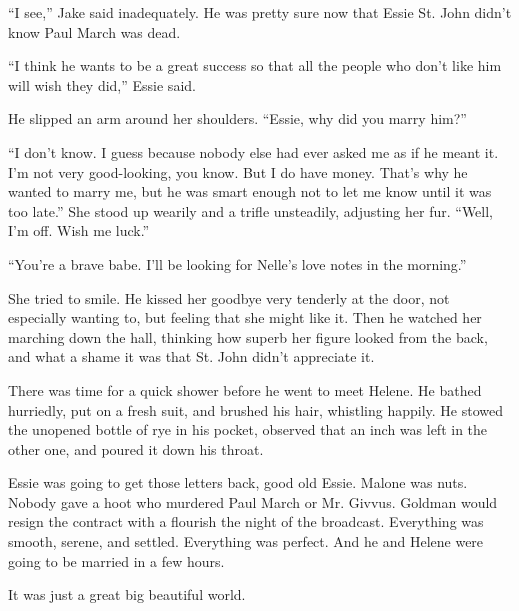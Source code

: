 \documentclass{novel}
\begin{document}
“I see,” Jake said inadequately. He was pretty sure now that Essie St. John didn’t know Paul March was dead.

“I think he wants to be a great success so that all the people who don’t like him will wish they did,” Essie said.

He slipped an arm around her shoulders. “Essie, why did you marry him?”

“I don’t know. I guess because nobody else had ever asked me as if he meant it. I’m not very good-looking, you know. But I do have money. That’s why he wanted to marry me, but he was smart enough not to let me know until it was too late.” She stood up wearily and a trifle unsteadily, adjusting her fur. “Well, I’m off. Wish me luck.”

“You’re a brave babe. I'll be looking for Nelle’s love notes in the morning.”

She tried to smile. He kissed her goodbye very tenderly at the door, not especially wanting to, but feeling that she might like it. Then he watched her marching down the hall, thinking how superb her figure looked from the back, and what a shame it was that St. John didn’t appreciate it.

There was time for a quick shower before he went to meet Helene. He bathed hurriedly, put on a fresh suit, and brushed his hair, whistling happily. He stowed the unopened bottle of rye in his pocket, observed that an inch was left in the other one, and poured it down his throat.

Essie was going to get those letters back, good old Essie. Malone was nuts. Nobody gave a hoot who murdered Paul March or Mr. Givvus. Goldman would resign the contract with a flourish the night of the broadcast. Everything was smooth, serene, and settled. Everything was perfect. And he and Helene were going to be married in a few hours.

It was just a great big beautiful world.

\vspace{2\nbs}
\clearpage
\thispagestyle{empty}

\begin{ChapterStart}
\vspace{3\nbs}
\end{ChapterStart}
\end{document}
